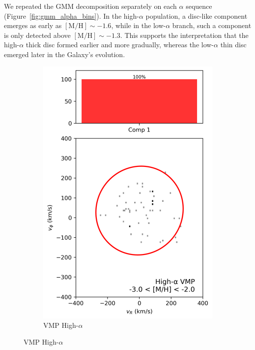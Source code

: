 \documentclass[a4paper,10pt]{article}
\begin{document}
\begin{multicols}{2}
We repeated the GMM decomposition separately on each $\alpha$ sequence (Figure~\ref{fig:gmm_alpha_bins}). 
In the high-$\alpha$ population, a disc-like component emerges as early as $\mathrm{[M/H]} \sim -1.6$, 
while in the low-$\alpha$ branch, such a component is only detected above $\mathrm{[M/H]} \sim -1.3$. 
This supports the interpretation that the high-$\alpha$ thick disc formed earlier and more gradually, 
whereas the low-$\alpha$ thin disc emerged later in the Galaxy’s evolution.

\begin{figure}[H]
  \centering
  \begin{subfigure}[t]{0.24\linewidth}
    \includegraphics[width=\linewidth]{../figures/gmm_vmp_high_alpha_k1.png}
    \caption{VMP High-$\alpha$}
  \end{subfigure}

\end{figure}
\end{multicols}
\end{document}
